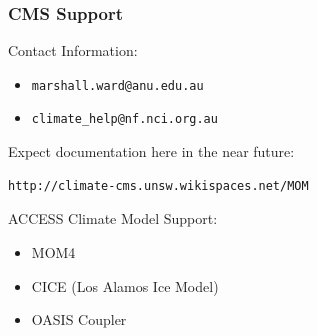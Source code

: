 \documentclass{beamer}
\begin{document}
\begin{frame}[fragile]
    \frametitle{CMS Support}
    
    Contact Information:
    \begin{itemize}
        \item \lstinline|marshall.ward@anu.edu.au|
        \item \lstinline|climate_help@nf.nci.org.au|
    \end{itemize}
    
    Expect documentation here in the near future:
    \begin{lstlisting}
http://climate-cms.unsw.wikispaces.net/MOM
    \end{lstlisting}
    
    ACCESS Climate Model Support:
    \begin{itemize}
        \item MOM4
        \item CICE (Los Alamos Ice Model)
        \item OASIS Coupler
    \end{itemize}
\end{frame}

\end{document}
